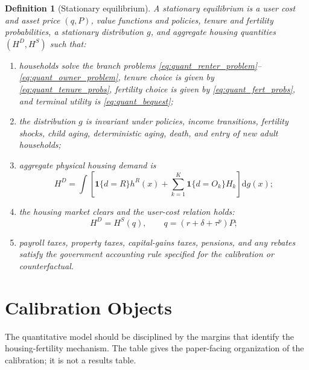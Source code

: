 \documentclass[11pt]{article}
\newtheorem{definition}{Definition}
\newcommand{\dd}{\mathrm d}
\newcommand{\1}{\mathbf 1}
\begin{document}
\begin{definition}[Stationary equilibrium]
A stationary equilibrium is a user cost and asset price $(q,P)$, value
functions and policies, tenure and fertility probabilities, a stationary
distribution $g$, and aggregate housing quantities $(H^D,H^S)$ such that:
\begin{enumerate}
\item households solve the branch problems
\eqref{eq:quant_renter_problem}--\eqref{eq:quant_owner_problem}, tenure choice
is given by \eqref{eq:quant_tenure_probs}, fertility choice is given by
\eqref{eq:quant_fert_probs}, and terminal utility is \eqref{eq:quant_bequest};
\item the distribution $g$ is invariant under policies, income transitions,
fertility shocks, child aging, deterministic aging, death, and entry of new
adult households;
\item aggregate physical housing demand is
\begin{equation}
H^D
=
\int
\left[
\1\{d=R\}h^R(x)
+\sum_{k=1}^K\1\{d=O_k\}H_k
\right]\dd g(x);
\label{eq:quant_hd}
\end{equation}
\item the housing market clears and the user-cost relation holds:
\begin{equation}
H^D=H^S(q),
\qquad
q=(r+\delta+\tau^p)P;
\label{eq:quant_clearing}
\end{equation}
\item payroll taxes, property taxes, capital-gains taxes, pensions, and any
rebates satisfy the government accounting rule specified for the calibration or
counterfactual.
\end{enumerate}
\end{definition}

\section{Calibration Objects}

The quantitative model should be disciplined by the margins that identify the
housing-fertility mechanism. The table gives the paper-facing organization of
the calibration; it is not a results table.
\end{document}
